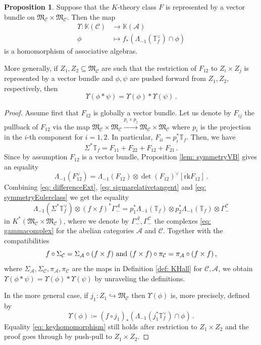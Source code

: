 \documentclass[12pt]{amsart}
\theoremstyle{definition}
\newtheorem{proposition}[definition]{Proposition}
\newcommand{\BK}{{\mathbb{K}}}
\newcommand{\BT}{{\mathbb{T}}}
\newcommand{\CA}{{\mathcal A}}
\newcommand{\CC}{{\mathcal C}}
\newcommand{\1}{\mathbf 1}
\newcommand{\FM}{{\mathfrak{M}}}
\newcommand{\rk}{\mathrm{rk}}
\begin{document}
\begin{proposition}\label{prop: homalgebras}
    Suppose that the $K$-theory class $F$ is represented by a vector bundle on $\FM_\CC\times \FM_\CC$. Then the map
    \begin{align*}
\Upsilon\colon \BK(\CC)&\rightarrow \BK(\CA)\\
\phi&\mapsto f_\ast(\Lambda_{-1}(\BT_f^\vee)\cap \phi)
\end{align*}
is a homomorphism of associative algebras. 

More generally, if $Z_1, Z_2\subseteq \FM_\CC$ are such that the restriction of $F_{12}$ to $Z_i\times Z_j$ is represented by a vector bundle and $\phi, \psi$ are pushed forward from $Z_1, Z_2$, respectively, then 
\[\Upsilon(\phi\ast \psi)=\Upsilon(\phi)\ast\Upsilon(\psi)\,.\]
\end{proposition}
\begin{proof}
Assume first that $F_{12}$ is globally a vector bundle. Let us denote by $F_{ij}$ the pullback of $F_{12}$ via the map $\FM_\CC\times \FM_\CC\xrightarrow{p_i\times  p_j}\FM_\CC\times \FM_\CC$ where $p_i$ is the projection in the $i$-th component for $i=1,2$. In particular, $F_{ii}=p_i^\ast \BT_f$. Then, we have
\begin{equation}
    \label{eq: sigmarelativetangent}
    \Sigma^\ast \BT_{f}=F_{11}+F_{22}+F_{12}+F_{21}\,.\end{equation}
Since by assumption $F_{12}$ is a vector bundle, Proposition \ref{lem: symmetryVB} gives an equality
\begin{equation}
    \label{eq: symmetryEulerclass}
\Lambda_{-1}(F_{12}^\vee)=\Lambda_{-1}(F_{12})\otimes \det(F_{12})^\vee[\rk F_{12}]\,.
\end{equation}
Combining \eqref{eq: differenceExt}, \eqref{eq: sigmarelativetangent} and \eqref{eq: symmetryEulerclass} we get the equality
\begin{equation}
    \label{eq: keyhomomorphism}
\Lambda_{-1}(\Sigma^\ast \BT_{f}^\vee)\otimes (f\times f)^\ast\Gamma_-^{\CA}=p_1^\ast\Lambda_{-1}(\BT_f)\otimes p_2^\ast\Lambda_{-1}(\BT_f)\otimes \Gamma_-^{\CC}\end{equation}
in $K^\ast(\FM_{\CC}\times \FM_{\CC})$, where we denote by $\Gamma_-^\CA, \Gamma_-^\CC$ the complexes \eqref{eq: gammacomplex} for the abelian categories $\CA$ and $\CC$. Together with the compatibilities
\[f\circ\Sigma_\CC=\Sigma_\CA\circ (f\times f)\textup{ and }(f\times f)\circ \pi_\CC=\pi_\CA\circ (f\times f)\,,\]
where $\Sigma_\CA, \Sigma_\CC, \pi_\CA, \pi_\CC$ are the maps in Definition \ref{def: KHall} for $\CC, \CA$, we obtain $\Upsilon(\phi\ast \psi)=\Upsilon(\phi)\ast\Upsilon(\psi)$ by unraveling the definitions.

In the more general case, if $j_1\colon Z_1\hookrightarrow \FM_\CC$ then $\Upsilon(\phi)$ is, more precisely, defined by
\[\Upsilon(\phi)\coloneqq (f\circ j_1)_\ast(\Lambda_{-1}(j_1^\ast \BT_f^\vee)\cap \phi)\,.\]
Equality \eqref{eq: keyhomomorphism} still holds after restriction to $Z_1\times Z_2$ and the proof goes through by push-pull to $Z_1\times Z_2$. \qedhere
\end{proof}
\end{document}
